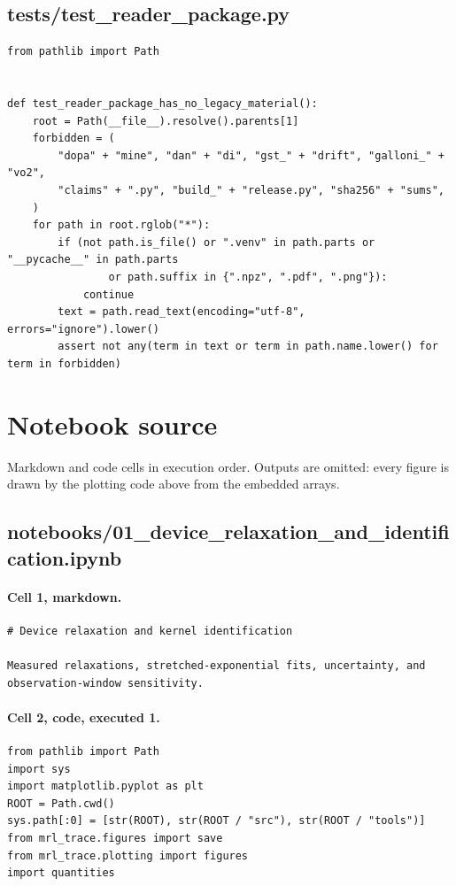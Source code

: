 \documentclass[a4paper,10pt]{article}
\begin{document}
\subsection{tests/test\_reader\_package.py}
\begin{Verbatim}
from pathlib import Path


def test_reader_package_has_no_legacy_material():
    root = Path(__file__).resolve().parents[1]
    forbidden = (
        "dopa" + "mine", "dan" + "di", "gst_" + "drift", "galloni_" + "vo2",
        "claims" + ".py", "build_" + "release.py", "sha256" + "sums",
    )
    for path in root.rglob("*"):
        if (not path.is_file() or ".venv" in path.parts or "__pycache__" in path.parts
                or path.suffix in {".npz", ".pdf", ".png"}):
            continue
        text = path.read_text(encoding="utf-8", errors="ignore").lower()
        assert not any(term in text or term in path.name.lower() for term in forbidden)
\end{Verbatim}
\section{Notebook source}
\label{sec:notebooks}
Markdown and code cells in execution order. Outputs are omitted: every figure is drawn by the plotting code above from the embedded arrays.
\subsection{notebooks/01\_device\_relaxation\_and\_identification.ipynb}
\paragraph{Cell 1, markdown.}
\begin{Verbatim}
# Device relaxation and kernel identification

Measured relaxations, stretched-exponential fits, uncertainty, and observation-window sensitivity.
\end{Verbatim}
\paragraph{Cell 2, code, executed 1.}
\begin{Verbatim}
from pathlib import Path
import sys
import matplotlib.pyplot as plt
ROOT = Path.cwd()
sys.path[:0] = [str(ROOT), str(ROOT / "src"), str(ROOT / "tools")]
from mrl_trace.figures import save
from mrl_trace.plotting import figures
import quantities
\end{Verbatim}
\end{document}
